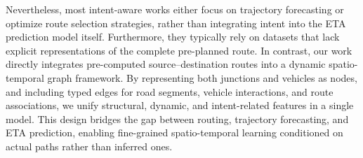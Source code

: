 Nevertheless, most intent-aware works either focus on trajectory forecasting or optimize route selection strategies, rather than integrating intent into the ETA prediction model itself. Furthermore, they typically rely on datasets that lack explicit representations of the complete pre-planned route. In contrast, our work directly integrates pre-computed source--destination routes into a dynamic spatio-temporal graph framework. By representing both junctions and vehicles as nodes, and including typed edges for road segments, vehicle interactions, and route associations, we unify structural, dynamic, and intent-related features in a single model. This design bridges the gap between routing, trajectory forecasting, and ETA prediction, enabling fine-grained spatio-temporal learning conditioned on actual paths rather than inferred ones.
